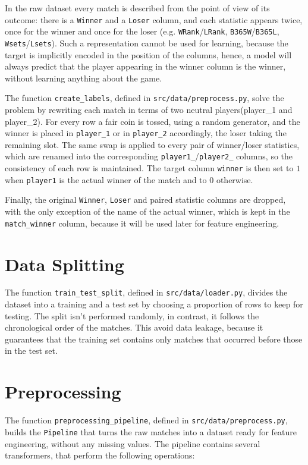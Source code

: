 \documentclass{article}
\begin{document}
In the raw dataset every match is described from the point of view of its outcome: there is a \texttt{Winner}
and a \texttt{Loser} column, and each statistic appears twice, once for the winner and once for the loser
(e.g. \texttt{WRank}/\texttt{LRank}, \texttt{B365W}/\texttt{B365L}, \texttt{Wsets}/\texttt{Lsets}). Such a
representation cannot be used for learning, because the target is implicitly encoded in the position of the
columns, hence, a model will always predict that the player appearing in the winner column is 
the winner, without learning anything about the game.

The function \texttt{create\_labels}, defined in \texttt{src/data/preprocess.py}, solve the problem 
by
rewriting each match in terms of two neutral players(player\_1 and player\_2). For every row a fair coin is tossed, using a
random generator, and the winner is placed in
\texttt{player\_1} or in \texttt{player\_2} accordingly, the loser taking the remaining slot. The same swap is
applied to every pair of winner/loser statistics, which are renamed into the corresponding
\texttt{player1\_}/\texttt{player2\_} columns, so the consistency of each row is maintained. The target column
\texttt{winner} is then set to $1$ when \texttt{player1} is the actual winner of the match and to $0$
otherwise.

Finally, the original \texttt{Winner}, \texttt{Loser} and paired statistic columns are dropped, with the only
exception of the name of the actual winner, which is kept in the \texttt{match\_winner} column, because it will
be used later for feature engineering.

\section{Data Splitting}

The function \texttt{train\_test\_split}, defined in \texttt{src/data/loader.py}, divides the dataset into a
training and a test set by choosing a proportion of rows to keep for testing. 
The split isn't performed randomly, in contrast, it follows the chronological order of the matches.
This avoid data leakage, because it guarantees that the training set contains only matches that occurred before those 
in the test set.

\section{Preprocessing}

The function \texttt{preprocessing\_pipeline}, defined in \texttt{src/data/preprocess.py}, builds the
\texttt{Pipeline} that turns the raw matches into a dataset ready for feature engineering, without any missing values.
The pipeline contains several transformers, that perform the following operations:
\end{document}
